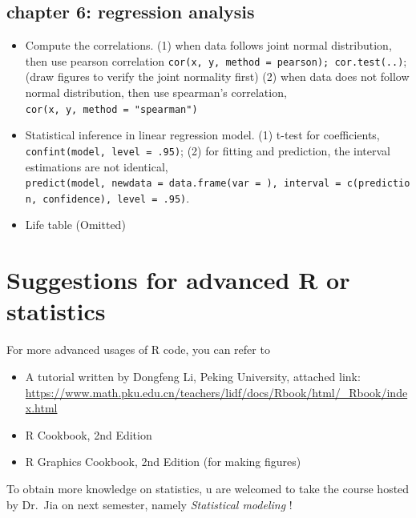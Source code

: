 \documentclass{article}
\begin{document}
\hypertarget{chapter-6-regression-analysis}{%
\subsection{chapter 6: regression
analysis}\label{chapter-6-regression-analysis}}

\begin{itemize}
\tightlist
\item
  Compute the correlations. (1) when data follows joint normal
  distribution, then use pearson correlation
  \texttt{cor(x,\ y,\ method\ =\ \textquotesingle{}pearson\textquotesingle{});\ cor.test(..)};
  (draw figures to verify the joint normality first) (2) when data does
  not follow normal distribution, then use spearman's correlation,
  \texttt{cor(x,\ y,\ method\ =\ "spearman")}
\item
  Statistical inference in linear regression model. (1) t-test for
  coefficients, \texttt{confint(model,\ level\ =\ .95)}; (2) for fitting
  and prediction, the interval estimations are not identical,
  \texttt{predict(model,\ newdata\ =\ data.frame(var\ =\ ),\ interval\ =\ c(\textquotesingle{}prediction\textquotesingle{},\ \textquotesingle{}confidence\textquotesingle{}),\ level\ =\ .95)}.
\item
  Life table (Omitted)
\end{itemize}

\hypertarget{suggestions-for-advanced-r-or-statistics}{%
\section{Suggestions for advanced R or
statistics}\label{suggestions-for-advanced-r-or-statistics}}

For more advanced usages of R code, you can refer to

\begin{itemize}
\tightlist
\item
  A tutorial written by Dongfeng Li, Peking University, attached link:
  \url{https://www.math.pku.edu.cn/teachers/lidf/docs/Rbook/html/_Rbook/index.html}
\item
  R Cookbook, 2nd Edition
\item
  R Graphics Cookbook, 2nd Edition (for making figures)
\end{itemize}

To obtain more knowledge on statistics, u are welcomed to take the
course hosted by Dr.~Jia on next semester, namely \emph{Statistical
modeling} !



\end{document}
